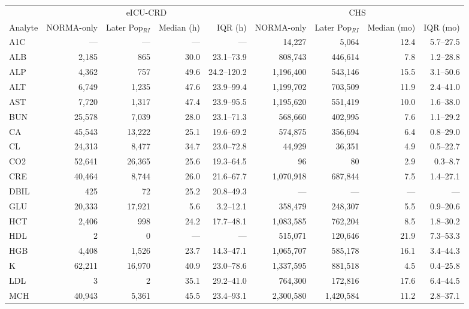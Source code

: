 \begin{table}[ht]
\centering
\footnotesize
\begin{tabular}{lrrrrrrrr}
\toprule
 & \multicolumn{4}{c}{eICU-CRD} & \multicolumn{4}{c}{CHS} \\
\cmidrule(lr){2-5}
\cmidrule(lr){6-9}
Analyte & NORMA-only & Later Pop$_{RI}$ & Median (h) & IQR (h) & NORMA-only & Later Pop$_{RI}$ & Median (mo) & IQR (mo) \\
\midrule
A1C & --- & --- & --- & --- & 14,227 & 5,064 & 12.4 & 5.7--27.5 \\
ALB & 2,185 & 865 & 30.0 & 23.1--73.9 & 808,743 & 446,614 & 7.8 & 1.2--28.8 \\
ALP & 4,362 & 757 & 49.6 & 24.2--120.2 & 1,196,400 & 543,146 & 15.5 & 3.1--50.6 \\
ALT & 6,749 & 1,235 & 47.6 & 23.9--99.4 & 1,199,702 & 703,509 & 11.9 & 2.4--41.0 \\
AST & 7,720 & 1,317 & 47.4 & 23.9--95.5 & 1,195,620 & 551,419 & 10.0 & 1.6--38.0 \\
BUN & 25,578 & 7,039 & 28.0 & 23.1--71.3 & 568,660 & 402,995 & 7.6 & 1.1--29.2 \\
CA & 45,543 & 13,222 & 25.1 & 19.6--69.2 & 574,875 & 356,694 & 6.4 & 0.8--29.0 \\
CL & 24,313 & 8,477 & 34.7 & 23.0--72.8 & 44,929 & 36,351 & 4.9 & 0.5--22.7 \\
CO2 & 52,641 & 26,365 & 25.6 & 19.3--64.5 & 96 & 80 & 2.9 & 0.3--8.7 \\
CRE & 40,464 & 8,744 & 26.0 & 21.6--67.7 & 1,070,918 & 687,844 & 7.5 & 1.4--27.1 \\
DBIL & 425 & 72 & 25.2 & 20.8--49.3 & --- & --- & --- & --- \\
GLU & 20,333 & 17,921 & 5.6 & 3.2--12.1 & 358,479 & 248,307 & 5.5 & 0.9--20.6 \\
HCT & 2,406 & 998 & 24.2 & 17.7--48.1 & 1,083,585 & 762,204 & 8.5 & 1.8--30.2 \\
HDL & 2 & 0 & --- & --- & 515,071 & 120,646 & 21.9 & 7.3--53.3 \\
HGB & 4,408 & 1,526 & 23.7 & 14.3--47.1 & 1,065,707 & 585,178 & 16.1 & 3.4--44.3 \\
K & 62,211 & 16,970 & 40.9 & 23.0--78.6 & 1,337,595 & 881,518 & 4.5 & 0.4--25.8 \\
LDL & 3 & 2 & 35.1 & 29.2--41.0 & 764,300 & 172,816 & 17.6 & 6.4--44.5 \\
MCH & 40,943 & 5,361 & 45.5 & 23.4--93.1 & 2,300,580 & 1,420,584 & 11.2 & 2.8--37.1 \\

\end{tabular}
\end{table}

